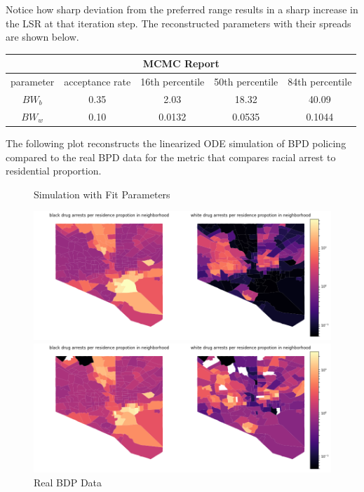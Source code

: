 \documentclass[10pt]{article}
\begin{document}
Notice how sharp deviation from the preferred range results in a sharp increase in the LSR at that iteration step. The reconstructed parameters with their spreads are shown below. 
\begin{center}
\begin{tabular}{ |c||c|c|c|c|}
 \hline
 \multicolumn{5}{|c|}{MCMC Report} \\
 \hline
  parameter & acceptance rate & 16th percentile & 50th percentile & 84th percentile \\
  \hline
 \hline
 $BW_b$ & 0.35 & 2.03 & 18.32 & 40.09\\
 \hline
 $BW_w$ & 0.10 & 0.0132 & 0.0535 & 0.1044\\
 \hline
\end{tabular}
\end{center}
The following plot reconstructs the linearized ODE simulation of BPD policing compared to the real BPD data for the metric that compares racial arrest to residential proportion.
 \begin{figure}[!htb]
 \begin{minipage}{0.5\textwidth}
     \caption{Simulation with Fit Parameters}
     \centering
     \includegraphics[width=\textwidth]{imgs/mcmcmap.png}
   \end{minipage}\hfill
   \begin{minipage}{0.5\textwidth}
     \caption{Real BDP Data}
     \centering
     \includegraphics[width=\textwidth]{imgs/logdrugpop.png}
   \end{minipage}\hfill
 \end{figure}
 
\end{document}
